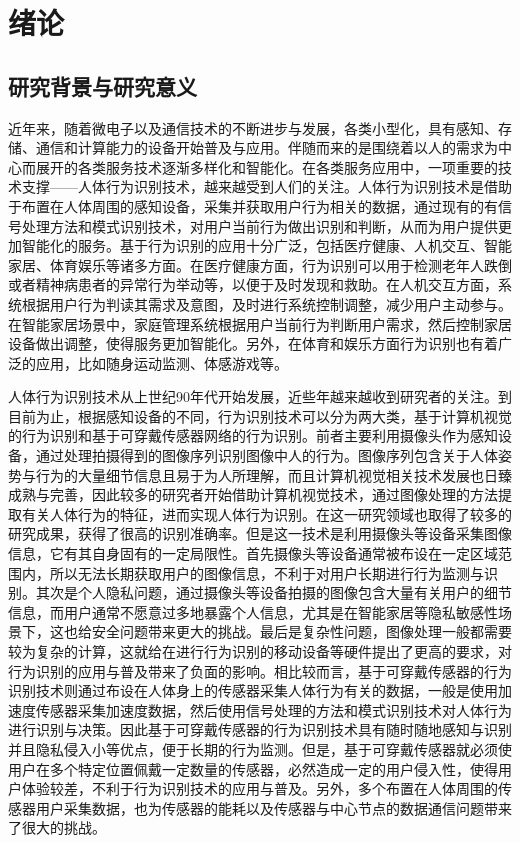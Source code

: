 \chapter{绪论}

\section{研究背景与研究意义}
\par 近年来，随着微电子以及通信技术的不断进步与发展，各类小型化，具有感知、存储、通信和计算能力的设备开始普及与应用。伴随而来的是围绕着以人的需求为中心而展开的各类服务技术逐渐多样化和智能化。在各类服务应用中，一项重要的技术支撑——人体行为识别技术，越来越受到人们的关注。人体行为识别技术是借助于布置在人体周围的感知设备，采集并获取用户行为相关的数据，通过现有的有信号处理方法和模式识别技术，对用户当前行为做出识别和判断，从而为用户提供更加智能化的服务。基于行为识别的应用十分广泛，包括医疗健康、人机交互、智能家居、体育娱乐等诸多方面。在医疗健康方面，行为识别可以用于检测老年人跌倒或者精神病患者的异常行为举动等，以便于及时发现和救助。在人机交互方面，系统根据用户行为判读其需求及意图，及时进行系统控制调整，减少用户主动参与。在智能家居场景中，家庭管理系统根据用户当前行为判断用户需求，然后控制家居设备做出调整，使得服务更加智能化。另外，在体育和娱乐方面行为识别也有着广泛的应用，比如随身运动监测、体感游戏等。

\par 人体行为识别技术从上世纪90年代开始发展\cite{surveyOnSensors}，近些年越来越收到研究者的关注。到目前为止，根据感知设备的不同，行为识别技术可以分为两大类，基于计算机视觉的行为识别和基于可穿戴传感器网络的行为识别。前者主要利用摄像头作为感知设备，通过处理拍摄得到的图像序列识别图像中人的行为\cite{surveyOnVision}。图像序列包含关于人体姿势与行为的大量细节信息且易于为人所理解，而且计算机视觉相关技术发展也日臻成熟与完善，因此较多的研究者开始借助计算机视觉技术，通过图像处理的方法提取有关人体行为的特征，进而实现人体行为识别。在这一研究领域也取得了较多的研究成果，获得了很高的识别准确率。但是这一技术是利用摄像头等设备采集图像信息，它有其自身固有的一定局限性。首先摄像头等设备通常被布设在一定区域范围内，所以无法长期获取用户的图像信息，不利于对用户长期进行行为监测与识别。其次是个人隐私问题，通过摄像头等设备拍摄的图像包含大量有关用户的细节信息，而用户通常不愿意过多地暴露个人信息，尤其是在智能家居等隐私敏感性场景下，这也给安全问题带来更大的挑战。最后是复杂性问题，图像处理一般都需要较为复杂的计算，这就给在进行行为识别的移动设备等硬件提出了更高的要求，对行为识别的应用与普及带来了负面的影响。相比较而言，基于可穿戴传感器的行为识别技术\cite{sensorBased}则通过布设在人体身上的传感器采集人体行为有关的数据，一般是使用加速度传感器采集加速度数据，然后使用信号处理的方法和模式识别技术对人体行为进行识别与决策。因此基于可穿戴传感器的行为识别技术具有随时随地感知与识别并且隐私侵入小等优点，便于长期的行为监测。但是，基于可穿戴传感器就必须使用户在多个特定位置佩戴一定数量的传感器，必然造成一定的用户侵入性，使得用户体验较差，不利于行为识别技术的应用与普及。另外，多个布置在人体周围的传感器用户采集数据，也为传感器的能耗以及传感器与中心节点的数据通信问题带来了很大的挑战。

